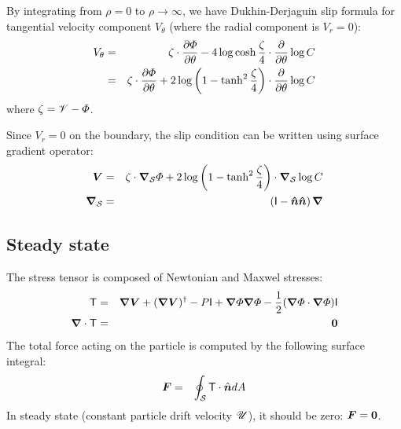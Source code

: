 By integrating from $\rho = 0$ to $\rho \rightarrow \infty$, 
we have Dukhin-Derjaguin slip formula for tangential velocity component $V_\theta$ 
(where the radial component is $V_r = 0$):
\begin{eqnarray} 
V_\theta &=& \zeta \cdot \frac{\partial \varPhi}{\partial \theta} -
      4\log\cosh \frac{\zeta}{4} \cdot \frac{\partial }{\partial \theta} \log C 
\\
&=& \zeta \cdot \frac{\partial \varPhi}{\partial \theta} + 
      2\log\left(1 - \tanh^2 \frac{\zeta}{4}\right) \cdot \frac{\partial }{\partial \theta} \log C 
\end{eqnarray}
where $\zeta = \mathscr{V} - \varPhi$.

Since $V_r = 0$ on the boundary, the slip condition can be written using surface
gradient operator:
\begin{eqnarray}
\boldsymbol{V} &=& 
\zeta \cdot \boldsymbol{\nabla}_\mathcal{S} \varPhi 
+ 2\log\left(1-\tanh^2\frac{\zeta}{4}\right) \cdot \boldsymbol{\nabla}_\mathcal{S} \log C \\
\boldsymbol{\nabla}_\mathcal{S} &=& \left(\mathsf{I} - \boldsymbol{\hat{n}}\boldsymbol{\hat{n}}\right) \boldsymbol{\nabla}
\end{eqnarray}


\subsection{Steady state}
The stress tensor is composed of Newtonian and Maxwel stresses:
\begin{eqnarray}
\mathsf{T} &=& \boldsymbol{\nabla} \boldsymbol{V} + (\boldsymbol{\nabla} \boldsymbol{V})^\dagger - P \mathsf{I}
+ \boldsymbol{\nabla} \varPhi \boldsymbol{\nabla} \varPhi - \frac{1}{2} (\boldsymbol{\nabla} \varPhi \cdot \boldsymbol{\nabla} \varPhi) \mathsf{I} \\
\boldsymbol{\nabla} \cdot \mathsf{T} &=& \boldsymbol{0}
\end{eqnarray}
The total force acting on the particle is computed by the following surface integral:
\begin{eqnarray}
\boldsymbol{F} &=& \oint_\mathcal{S} \mathsf{T} \cdot \hat{\boldsymbol{n}}  dA 
\end{eqnarray}
In steady state (constant particle drift velocity $\mathscr{U}$), it should be zero: $\boldsymbol{F} = \boldsymbol{0}$.
